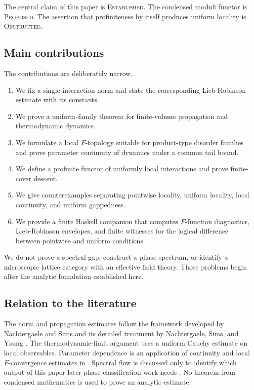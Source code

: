 \documentclass[12pt]{article}
\theoremstyle{definition}
\theoremstyle{remark}
\newcommand{\EST}{\textsc{Established}}
\newcommand{\PROP}{\textsc{Proposed}}
\newcommand{\OBS}{\textsc{Obstructed}}
\begin{document}
The central claim of this paper is \EST{}.  The condensed moduli functor is
\PROP{}.  The assertion that profiniteness by itself produces uniform
locality is \OBS{}.

\subsection{Main contributions}

The contributions are deliberately narrow.

\begin{enumerate}[leftmargin=2.3em]
\item We fix a single interaction norm and state the corresponding
Lieb-Robinson estimate with its constants.
\item We prove a uniform-family theorem for finite-volume propagation and
thermodynamic dynamics.
\item We formulate a local $F$-topology suitable for product-type disorder
families and prove parameter continuity of dynamics under a common tail
bound.
\item We define a profinite functor of uniformly local interactions and prove
finite-cover descent.
\item We give counterexamples separating pointwise locality, uniform
locality, local continuity, and uniform gappedness.
\item We provide a finite Haskell companion that computes $F$-function
diagnostics, Lieb-Robinson envelopes, and finite witnesses for the logical
difference between pointwise and uniform conditions.
\end{enumerate}

We do not prove a spectral gap, construct a phase spectrum, or identify a
microscopic lattice category with an effective field theory.  Those problems
begin after the analytic foundation established here.

\subsection{Relation to the literature}

The norm and propagation estimates follow the framework developed by
Nachtergaele and Sims and its detailed treatment by Nachtergaele, Sims, and
Young \cite{NachtergaeleSims2010,NSY2019}.  The thermodynamic-limit argument
uses a uniform Cauchy estimate on local observables.  Parameter dependence is
an application of continuity and local $F$-convergence estimates in
\cite{NSY2019}.  Spectral flow is discussed only to identify which output of
this paper later phase-classification work needs \cite{BMNS2012}.  No theorem
from condensed mathematics is used to prove an analytic estimate.
\end{document}
